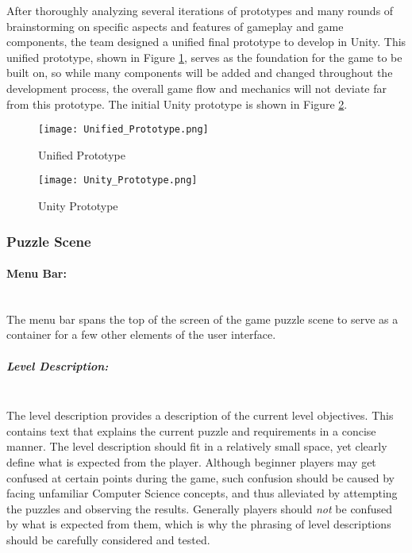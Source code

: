 After thoroughly analyzing several iterations of prototypes and many rounds of 
brainstorming on specific aspects and features of gameplay and game components, 
the team designed a unified final prototype to develop in Unity. This unified prototype, 
shown in Figure \ref{fig:Unified_Prototype}, serves as the foundation for the game to 
be built on, so while many components will be added and changed throughout the 
development process, the overall game flow and mechanics will not deviate far from 
this prototype. The initial Unity prototype is shown in Figure \ref{fig:Unity_Prototype}.\\

\begin{figure}[H]
	\caption{Unified Prototype}
	\label{fig:Unified_Prototype}
	\centering
	\texttt{[image: Unified\_Prototype.png]}
\end{figure}

\begin{figure}[H]
	\caption{Unity Prototype}
	\label{fig:Unity_Prototype}
	\centering
	\texttt{[image: Unity\_Prototype.png]}
\end{figure}

\subsubsection{Puzzle Scene}
\paragraph{Menu Bar:} ~\\
The menu bar spans the top of the screen of the game puzzle scene to serve as a 
container for a few other elements of the user interface.

\subparagraph{Level Description:} ~\\
The level description provides a description of the current level objectives. This 
contains text that explains the current puzzle and requirements in a concise manner. 
The level description should fit in a relatively small space, yet clearly define what is 
expected from the player. Although beginner players may get confused at certain 
points during the game, such confusion should be caused by facing unfamiliar 
Computer Science concepts, and thus alleviated by attempting the puzzles and 
observing the results. Generally players should \textit{not} be confused by what 
is expected from them, which is why the phrasing of level descriptions should be 
carefully considered and tested.

